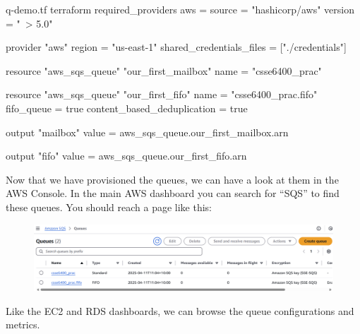 \documentclass{csse4400}
\begin{document}

\begin{code}[language=terraform, numbers=none]{q-demo.tf}
terraform {
  required_providers {
    aws = {
      source = "hashicorp/aws"
      version = "~> 5.0"
    }
  }
}

provider "aws" {
  region = "us-east-1"
  shared_credentials_files = ["./credentials"]
}

resource "aws_sqs_queue" "our_first_mailbox" {
  name                        = "csse6400_prac"
}

resource "aws_sqs_queue" "our_first_fifo" {
  name                        = "csse6400_prac.fifo"
  fifo_queue                  = true
  content_based_deduplication = true
}

output "mailbox" {
  value = aws_sqs_queue.our_first_mailbox.arn
}

output "fifo" {
  value = aws_sqs_queue.our_first_fifo.arn
}
\end{code}

Now that we have provisioned the queues, we can have a look at them in the AWS Console.
In the main AWS dashboard you can search for ``SQS'' to find these queues.
You should reach a page like this:

\begin{figure}[H]
  \includegraphics[width=\textwidth]{images/sqspanel}
\end{figure}

Like the EC2 and RDS dashboards,
we can browse the queue configurations and metrics.
  
\end{document}
